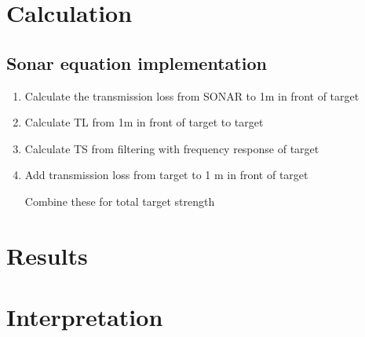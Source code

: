 \documentclass[11pt]{article}
\begin{document}
\section{Calculation}

\subsection*{Sonar equation implementation}
\begin{enumerate}
    \item Calculate the transmission loss from SONAR to 1m in front of target
    \item Calculate TL from 1m in front of target to target 
    \item Calculate TS from filtering with frequency response of target
    \item Add transmission loss from target to 1 m in front of target
    
    Combine these for total target strength
\end{enumerate}








\section{Results}




\section{Interpretation}
\end{document}
